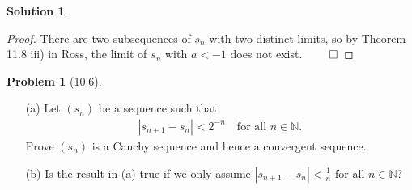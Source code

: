 \documentclass[12pt]{article}
\theoremstyle{definition} %
\newtheorem{solution}{Solution}
\newtheorem{problem}{Problem}
\theoremstyle{plain} %
\begin{document}
\begin{solution}
\begin{enumerate}
\begin{proof}
        There are two subsequences of $s_n$ with two distinct limits, so by Theorem 11.8 iii) in Ross, the limit of $s_n$ with $a < -1$ does not exist. $\qed$
    \end{proof}
\end{enumerate}
\end{solution}



\begin{problem}[10.6]
    \begin{itemize}
        \item[(a)] Let $(s_n)$ be a sequence such that
        \begin{align}
        |s_{n+1} - s_n| < 2^{-n} \quad \text{for all } n \in \mathbb{N}.
        \end{align}
        Prove $(s_n)$ is a Cauchy sequence and hence a convergent sequence.
        \item[(b)] Is the result in (a) true if we only assume $|s_{n+1} - s_n| < \frac{1}{n}$ for all $n \in \mathbb{N}$?
    \end{itemize}


\end{problem}
\end{document}
